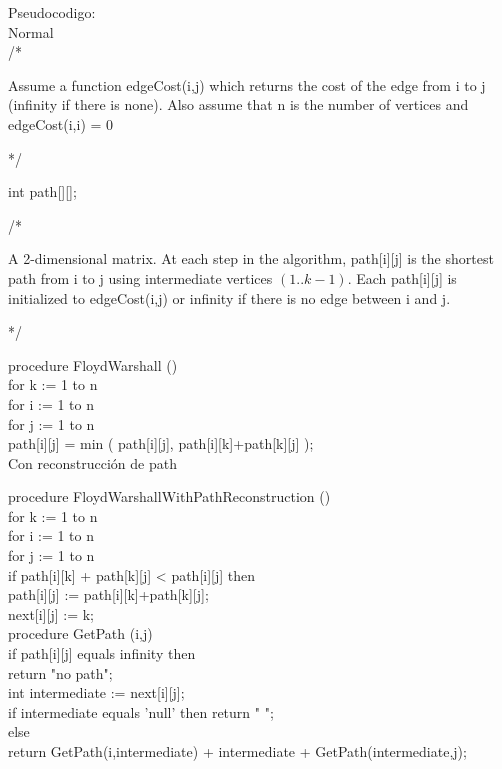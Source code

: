 \documentclass[10pt,letterpaper,twocolumn,twosided]{article}
\begin{document}
Pseudocodigo:\\

Normal\\

/* 

    Assume a function edgeCost(i,j) which returns the cost of the edge from i to j
    (infinity if there is none).
    Also assume that n is the number of vertices and edgeCost(i,i) = 0

*/
 
 int path[][];

 /*

    A 2-dimensional matrix. At each step in the algorithm, path[i][j] is the shortest path
    from i to j using intermediate vertices $(1 .. k - 1)$.  Each path[i][j] is initialized to
    edgeCost(i,j) or infinity if there is no edge between i and j.

 */

 procedure FloydWarshall ()\\
    for k := 1 to n\\
       for i := 1 to n\\
          for j := 1 to n\\
             path[i][j] = min ( path[i][j], path[i][k]+path[k][j] );\\

Con reconstrucción de path

procedure FloydWarshallWithPathReconstruction ()\\
    for k := 1 to n\\
       for i := 1 to n\\
          for j := 1 to n\\
             if path[i][k] + path[k][j] < path[i][j] then\\
                path[i][j] := path[i][k]+path[k][j];\\
                next[i][j] := k;\\

 procedure GetPath (i,j)\\
    if path[i][j] equals infinity then\\
      return "no path";\\
    int intermediate := next[i][j];\\
    if intermediate equals 'null' then
      return " "; \\
   else\\
      return GetPath(i,intermediate) + intermediate + GetPath(intermediate,j);\\
      
\end{document}
